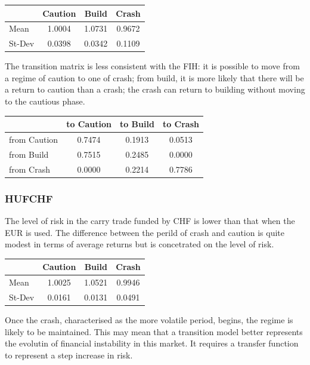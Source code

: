 \documentclass[12pt, a4paper, oneside]{article} %
\begin{document}
\begin{centering}
 \begin{tabular}{l c c c}
 & Caution & Build & Crash \\
 \hline
 Mean & 1.0004 & 1.0731 & 0.9672\\
 St-Dev & 0.0398 & 0.0342 & 0.1109\\
 \end{tabular}
 \end{centering}

The transition matrix is less consistent with the FIH:  it is possible to move from a regime of caution to one of crash; from build, it is more likely that there will be a return to caution than a crash; the crash can return to building without moving to the cautious phase.   

 \begin{centering}
 \begin{tabular}{l c c c}
 & to Caution & to Build & to Crash\\
 \hline
 from Caution & 0.7474 & 0.1913 & 0.0513\\
 from Build & 0.7515 & 0.2485 & 0.0000\\
 from Crash & 0.0000 & 0.2214 & 0.7786
 \end{tabular}
 \end{centering}

\subsubsection{HUFCHF}
The level of risk in the carry trade funded by CHF is lower than that when the EUR is used.  The difference between the perild of crash and caution is quite modest in terms of average returns but is concetrated on the level of risk.  

\begin{centering}
 \begin{tabular}{l c c c}
 & Caution & Build & Crash \\
 \hline
 Mean & 1.0025 & 1.0521 & 0.9946\\
 St-Dev & 0.0161 & 0.0131 & 0.0491\\
 \end{tabular}
 \end{centering}

Once the crash, characterised as the more volatile period, begins, the regime is likely to be maintained.  This may mean that a transition model better represents the evolutin of financial instability in this market. It requires a transfer function to represent a step increase in risk. 
\end{document}
